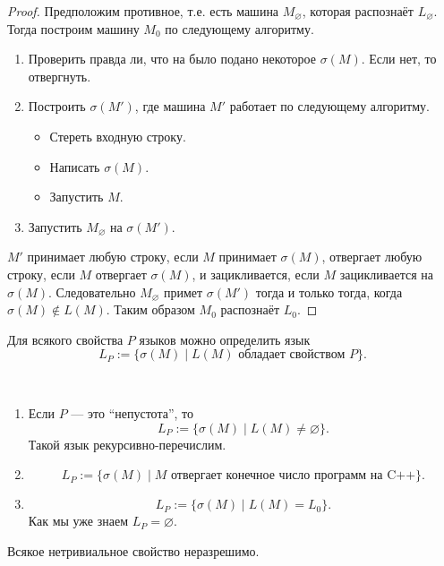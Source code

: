 \documentclass[12pt,a4paper]{article}
\begin{document}
    \begin{proof}
        Предположим противное, т.е. есть машина $M_\varnothing$, которая распознаёт $L_\varnothing$. Тогда построим машину $M_0$ по следующему алгоритму.
        \begin{enumerate}
            \item Проверить правда ли, что на было подано некоторое $\sigma(M)$. Если нет, то отвергнуть.
            \item Построить $\sigma(M')$, где машина $M'$ работает по следующему алгоритму.
                \begin{itemize}
                    \item Стереть входную строку.
                    \item Написать $\sigma(M)$.
                    \item Запустить $M$.
                \end{itemize}
            \item Запустить $M_\varnothing$ на $\sigma(M')$.
        \end{enumerate}
        $M'$ принимает любую строку, если $M$ принимает $\sigma(M)$, отвергает любую строку, если $M$ отвергает $\sigma(M)$, и зацикливается, если $M$ зацикливается на $\sigma(M)$. Следовательно $M_\varnothing$ примет $\sigma(M')$ тогда и только тогда, когда $\sigma(M) \notin L(M)$. Таким образом $M_0$ распознаёт $L_0$.
    \end{proof}

    \begin{definition}
        Для всякого свойства $P$ языков можно определить язык
        \[L_P := \{\sigma(M) \mid \text{$L(M)$ обладает свойством $P$}\}.\]
    \end{definition}

    \begin{example}\ 
        \begin{enumerate}
            \item Если $P$ --- это ``непустота'', то
                \[L_P := \{\sigma(M) \mid L(M) \neq \varnothing\}.\]
                Такой язык рекурсивно-перечислим.
            \item
                \[L_P := \{\sigma(M) \mid \text{$M$ отвергает конечное число программ на C++}\}.\]
            \item
                \[L_P := \{\sigma(M) \mid L(M) = L_0\}.\]
                Как мы уже знаем $L_P = \varnothing$.
        \end{enumerate}
    \end{example}

    \begin{theorem}[Райса]
        Всякое нетривиальное свойство неразрешимо.
    \end{theorem}

\end{document}
